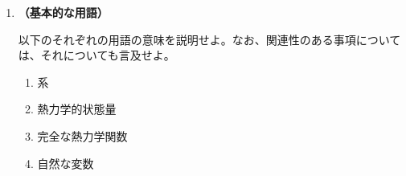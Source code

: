 \documentclass[uplatex,dvipdfmx,a4paper,11pt]{jsarticle}
\begin{document}
\begin{enumerate}

\item
{\bf （基本的な用語）}

以下のそれぞれの用語の意味を説明せよ。なお、関連性のある事項については、それについても言及せよ。

\begin{enumerate}
\item
系

%
%
%

\item
熱力学的状態量

%


\item
完全な熱力学関数

%


\item
自然な変数

%


\end{enumerate}
\end{enumerate}
\end{document}
